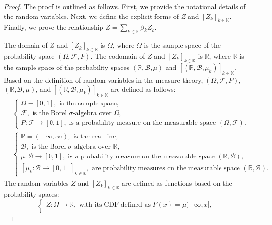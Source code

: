 \documentclass[twoside,11pt]{article}
\newcommand{\agentspace}{\mathbb{K}}
\newcommand{\agentcounter}{k}
\newcommand{\utility}{Z}
\newcommand{\modelparameter}{\beta}
\newcounter{definition0}
\begin{document}
\begin{proof}
The proof is outlined as follows. First, we provide the notational details of the random variables. Next, we define the explicit forms of $Z$ and $[Z_k]_{\agentcounter\in\agentspace}$. Finally, we prove the relationship $Z=\sum_{\agentcounter\in\agentspace}\modelparameter{}_{\agentcounter{}}\utility_{\agentcounter{}}$.

The domain of $Z$ and $[Z_k]_{\agentcounter\in\agentspace}$ is $\Omega$, where $\Omega$ is the sample space of the probability space $(\Omega,\mathcal{F}, P)$.
The codomain of $Z$ and $[Z_k]_{\agentcounter\in\agentspace}$ is $\mathbb{R}$, where $\mathbb{R}$ is the sample space of the probability spaces $(\mathbb{R}, \mathcal{B}, \mu)$ and $[(\mathbb{R}, \mathcal{B}, \mu_k)]_{\agentcounter\in\agentspace}$.
Based on the definition of random variables in the measure theory, $(\Omega,\mathcal{F}, P)$, $(\mathbb{R}, \mathcal{B}, \mu)$, and $[(\mathbb{R}, \mathcal{B}, \mu_k)]_{\agentcounter\in\agentspace}$ are defined as follows:
\begin{equation*}
\begin{split}
& \begin{cases}
\Omega=[0,1], \text{ is the sample space},\\
\mathcal{F}, \text{ is the Borel $\sigma$-algebra over $\Omega$},\\
P:\mathcal{F}\rightarrow [0,1], \text{ is a probability measure on the measurable space $(\Omega,\mathcal{F})$}.
\end{cases}\\
& \begin{cases}
\mathbb{R}=(-\infty,\infty), \text{ is the real line},\\
\mathcal{B}, \text{ is the Borel $\sigma$-algebra over $\mathbb{R}$},\\
\mu:\mathcal{B}\rightarrow [0,1], \text{ is a probability measure on the measurable space $(\mathbb{R}, \mathcal{B})$},\\
[\mu_k:\mathcal{B}\rightarrow [0,1]]_{\agentcounter\in\agentspace}, \text{ are probability measures on the measurable space $(\mathbb{R}, \mathcal{B})$}.
\end{cases}
\end{split}
\end{equation*}
The random variables $Z$ and $[Z_k]_{\agentcounter\in\agentspace}$ are defined as functions based on the probability spaces:
\begin{equation*}
\begin{cases}
Z:\Omega\rightarrow\mathbb{R}, \text{ with its CDF defined as $F(x)=\mu(-\infty,x]$},\\

\end{cases}
\end{equation*}
\end{proof}
\end{document}
